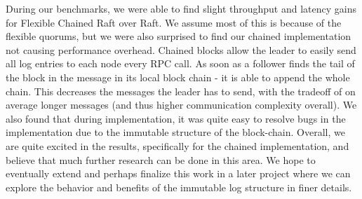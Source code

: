 During our benchmarks, we were able to find slight throughput and latency gains for Flexible Chained Raft over Raft. 
We assume most of this is because of the flexible quorums, but we were also surprised to find our chained implementation not causing performance overhead. 
Chained blocks allow the leader to easily send all log entries to each node every RPC call. As soon as a follower finds the tail of the block in the message in its local block chain - it is able to append the whole chain.
This decreases the messages the leader has to send, with the tradeoff of on average longer messages (and thus higher communication complexity overall). 
We also found that during implementation, it was quite easy to resolve bugs in the implementation due to the immutable structure of the block-chain.
Overall, we are quite excited in the results, specifically for the chained implementation, and believe that much further research can be done in this area.
We hope to eventually extend and perhaps finalize this work in a later project where we can explore the behavior and benefits of the immutable log structure in finer details. 

